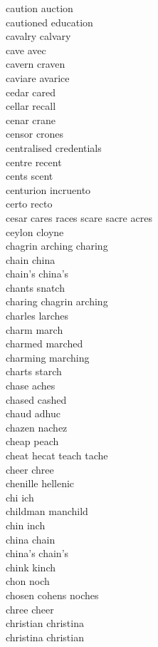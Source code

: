 caution auction\\
cautioned education\\
cavalry calvary\\
cave avec\\
cavern craven\\
caviare avarice\\
cedar cared\\
cellar recall\\
cenar crane\\
censor crones\\
centralised credentials\\
centre recent\\
cents scent\\
centurion incruento\\
certo recto\\
cesar cares races scare sacre acres\\
ceylon cloyne\\
chagrin arching charing\\
chain china\\
chain's china's\\
chants snatch\\
charing chagrin arching\\
charles larches\\
charm march\\
charmed marched\\
charming marching\\
charts starch\\
chase aches\\
chased cashed\\
chaud adhuc\\
chazen nachez\\
cheap peach\\
cheat hecat teach tache\\
cheer chree\\
chenille hellenic\\
chi ich\\
childman manchild\\
chin inch\\
china chain\\
china's chain's\\
chink kinch\\
chon noch\\
chosen cohens noches\\
chree cheer\\
christian christina\\
christina christian\\
